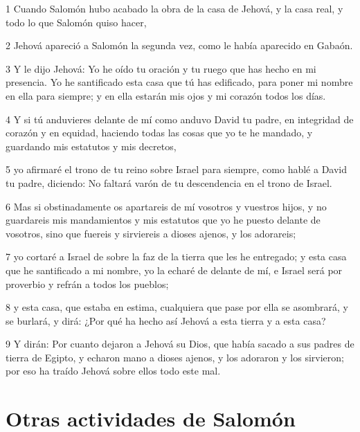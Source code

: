 \par 1 Cuando Salomón hubo acabado la obra de la casa de Jehová, y la casa real, y todo lo que Salomón quiso hacer,
\par 2 Jehová apareció a Salomón la segunda vez, como le había aparecido en Gabaón. 
\par 3 Y le dijo Jehová: Yo he oído tu oración y tu ruego que has hecho en mi presencia. Yo he santificado esta casa que tú has edificado, para poner mi nombre en ella para siempre; y en ella estarán mis ojos y mi corazón todos los días.
\par 4 Y si tú anduvieres delante de mí como anduvo David tu padre, en integridad de corazón y en equidad, haciendo todas las cosas que yo te he mandado, y guardando mis estatutos y mis decretos,
\par 5 yo afirmaré el trono de tu reino sobre Israel para siempre, como hablé a David tu padre, diciendo: No faltará varón de tu descendencia en el trono de Israel. 
\par 6 Mas si obstinadamente os apartareis de mí vosotros y vuestros hijos, y no guardareis mis mandamientos y mis estatutos que yo he puesto delante de vosotros, sino que fuereis y sirviereis a dioses ajenos, y los adorareis;
\par 7 yo cortaré a Israel de sobre la faz de la tierra que les he entregado; y esta casa que he santificado a mi nombre, yo la echaré de delante de mí, e Israel será por proverbio y refrán a todos los pueblos;
\par 8 y esta casa, que estaba en estima, cualquiera que pase por ella se asombrará, y se burlará, y dirá: ¿Por qué ha hecho así Jehová a esta tierra y a esta casa? 
\par 9 Y dirán: Por cuanto dejaron a Jehová su Dios, que había sacado a sus padres de tierra de Egipto, y echaron mano a dioses ajenos, y los adoraron y los sirvieron; por eso ha traído Jehová sobre ellos todo este mal.

\section*{Otras actividades de Salomón}

